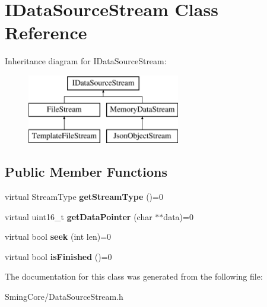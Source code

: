 \hypertarget{class_i_data_source_stream}{}\section{I\+Data\+Source\+Stream Class Reference}
\label{class_i_data_source_stream}
Inheritance diagram for I\+Data\+Source\+Stream\+:\begin{figure}[H]
\begin{center}
\leavevmode
\includegraphics[height=3.000000cm]{class_i_data_source_stream}
\end{center}
\end{figure}
\subsection*{Public Member Functions}
\begin{DoxyCompactItemize}
\item 
\hypertarget{class_i_data_source_stream_a589085e0eea011acdc401b79831826e0}{}virtual Stream\+Type {\bfseries get\+Stream\+Type} ()=0\label{class_i_data_source_stream_a589085e0eea011acdc401b79831826e0}

\item 
\hypertarget{class_i_data_source_stream_ac4eacca7f55c8618a2ca52d90d6cb919}{}virtual uint16\+\_\+t {\bfseries get\+Data\+Pointer} (char $\ast$$\ast$data)=0\label{class_i_data_source_stream_ac4eacca7f55c8618a2ca52d90d6cb919}

\item 
\hypertarget{class_i_data_source_stream_a3a2c1c9c686a6c99041316dc0531c255}{}virtual bool {\bfseries seek} (int len)=0\label{class_i_data_source_stream_a3a2c1c9c686a6c99041316dc0531c255}

\item 
\hypertarget{class_i_data_source_stream_a143958f311cc98fbfaaec1d4d5cdfe47}{}virtual bool {\bfseries is\+Finished} ()=0\label{class_i_data_source_stream_a143958f311cc98fbfaaec1d4d5cdfe47}

\end{DoxyCompactItemize}


The documentation for this class was generated from the following file\+:\begin{DoxyCompactItemize}
\item 
Sming\+Core/Data\+Source\+Stream.\+h\end{DoxyCompactItemize}
